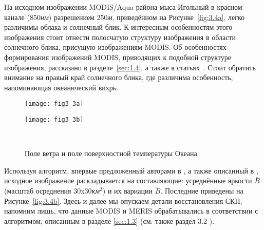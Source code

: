 На исходном изображении MODIS/Aqua района мыса Игольный в красном канале (850\textit{нм}) разрешением 250\textit{м}, приведённом на Рисунке~\ref{fig:3.4a}, легко различимы облака и солнечный блик. К интересным особенностям этого изображения стоит отнести полосчатую структуру изображения в области солнечного блика, присущую изображениям MODIS. Об особенностях формирования изображений MODIS, приводящих к подобной структуре изображения, рассказано в разделе~\ref{sec:1.4}, а также в статьях~\citep{Myasoedov2010a, Myasoedov2010}. Стоит обратить внимание на правый край солнечного блика, где различима особенность, напоминающая океанический вихрь.



\begin{figure}[H]
   	\centering
	\begin{minipage}{.47\textwidth}
	    \subcaptionbox{\label{fig:3.3a}}
		{\texttt{[image: fig3\_3a]}}
	\end{minipage}
	\hfill
	\begin{minipage}{.47\textwidth}
	    \subcaptionbox{\label{fig:3.3b}}
		{\texttt{[image: fig3\_3b]}}
	\end{minipage}
    \\
    \caption{Поле ветра и поле поверхностной температуры Океана}
    \label{fig:3.3}
\end{figure}


Используя алгоритм, впервые предложенный авторами в \citep{Kudryavtsev2010,Myasoedov2010a}, а также описанный в \citep{Myasoedov2010}, исходное изображение раскладывается на составляющие: усреднённые яркости $\bar{B}$ (масштаб осреднения 30x30\textit{км${}^2$}) и их вариации $\tilde{B}$. Последние приведены на Рисунке~\ref{fig:3.4b}. Здесь и далее мы опускаем детали восстановления СКН, напомним лишь, что данные MODIS и MERIS обрабатывались в соответствии с алгоритмом, описанным в разделе \ref{sec:1.3} (см. также раздел 3.2 \citep{Myasoedov2010}).




